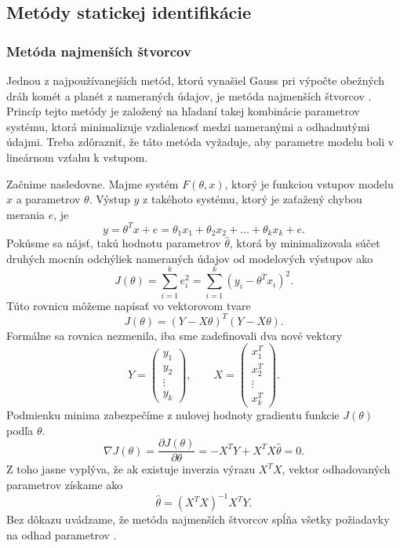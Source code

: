 \subsection{Metódy statickej identifikácie}
\subsubsection*{Metóda najmenších štvorcov}
Jednou z najpoužívanejších metód, ktorú vynašiel Gauss pri výpočte obežných dráh komét a planét z nameraných údajov, je metóda najmenších štvorcov \cite{hostetter:recursive_est:1987}. Princíp tejto metódy je založený na hľadaní takej kombinácie parametrov systému, ktorá minimalizuje vzdialenosť medzi nameranými a odhadnutými údajmi. Treba zdôrazniť, že táto metóda vyžaduje, aby parametre modelu boli v lineárnom vzťahu k vstupom.

Začnime nasledovne. Majme systém $ F(\theta, x) $, ktorý je funkciou vstupov modelu $ x $ a parametrov $ \theta $. Výstup $ y $ z takéhoto systému, ktorý je zaťažený chybou merania $ e $, je
\begin{equation}
	y = \theta^T x + e = \theta_1x_1 + \theta_2x_2 + \dots + \theta_kx_k + e.
\end{equation}
Pokúsme sa nájsť, takú hodnotu parametrov $ \hat{\theta} $, ktorá by minimalizovala súčet druhých mocnín odchýliek nameraných údajov od modelových výstupov ako
\begin{equation}
	J\left(\theta\right) = \sum_{i=1}^{k} e_i^2 = \sum_{i=1}^{k} \left(y_i - \theta^T x_i\right)^2.
\end{equation}
Túto rovnicu môžeme napísať vo vektorovom tvare
\begin{equation}
	J\left(\theta\right) = \left(Y - X\theta \right)^T \left(Y - X\theta \right).
\end{equation} 
Formálne sa rovnica nezmenila, iba sme zadefinovali dva nové vektory
\begin{equation}
	Y = \begin{pmatrix}
			y_1 \\
			y_2 \\
			\vdots \\
			y_k
		\end{pmatrix}, \qquad
	X = \begin{pmatrix}
			x_1^T \\
			x_2^T \\
			\vdots \\
			x_k^T
		\end{pmatrix}.
\end{equation}
Podmienku minima zabezpečíme z nulovej hodnoty gradientu funkcie $ J(\theta) $ podľa $ \theta $.
\begin{equation}
	\nabla J \left(\theta\right) = \frac{\partial J \left(\theta\right)}{\partial \theta} = -X^T Y + X^T X\hat{\theta} = 0.
\end{equation}
Z toho jasne vyplýva, že ak existuje inverzia výrazu $ X^T X $, vektor odhadovaných parametrov získame ako 
\begin{equation}
	\hat{\theta} = \left(X^T X\right)^{-1}X^T Y.
\end{equation}
Bez dôkazu uvádzame, že metóda najmenších štvorcov spĺňa všetky požiadavky na odhad parametrov \cite{fikar:identifikacia:1999}.

